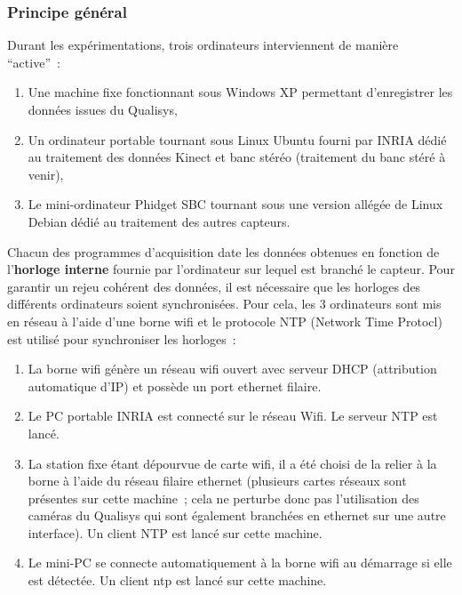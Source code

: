 \documentclass[a4paper, 10pt ]{article}
\begin{document}
\subsubsection{Principe général}
Durant les expérimentations, trois ordinateurs interviennent de manière ``active''~:
\begin{enumerate}
	\item Une machine fixe fonctionnant sous Windows XP permettant d'enregistrer les données issues du Qualisys,
	\item Un ordinateur portable tournant sous Linux Ubuntu fourni par INRIA dédié au traitement des données Kinect et banc stéréo (traitement du banc stéré à venir),
	\item Le mini-ordinateur Phidget SBC tournant sous une version allégée de Linux Debian dédié au traitement des autres capteurs.
\end{enumerate}
Chacun des programmes d'acquisition date les données obtenues en fonction de l'\textbf{horloge interne} fournie par l'ordinateur sur lequel est branché le capteur. Pour garantir un rejeu cohérent des données, il est nécessaire que les horloges des différents ordinateurs soient synchronisées. Pour cela, les 3 ordinateurs sont mis en réseau à l'aide d'une borne wifi et le protocole NTP (Network Time Protocl) est utilisé pour synchroniser les horloges~:
\begin{enumerate}
	\item La borne wifi génère un réseau wifi ouvert avec serveur DHCP (attribution automatique d'IP) et possède un port ethernet filaire.
	\item Le PC portable INRIA est connecté sur le réseau Wifi. Le serveur NTP est lancé.
	\item La station fixe étant dépourvue de carte wifi, il a été choisi de la relier à la borne à l'aide du réseau filaire ethernet (plusieurs cartes réseaux sont présentes sur cette machine~; cela ne perturbe donc pas l'utilisation des caméras du Qualisys qui sont également branchées en ethernet sur une autre interface). Un client NTP est lancé sur cette machine.
	\item Le mini-PC se connecte automatiquement à la borne wifi au démarrage si elle est détectée. Un client ntp est lancé sur cette machine.
\end{enumerate} 
\end{document}
